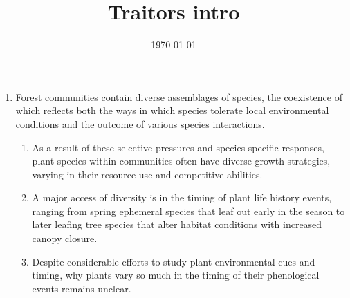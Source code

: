 \documentclass{article}
\begin{document}
\title{Traitors intro}
\date{\today}

\maketitle 

\begin{enumerate}

\item Forest communities contain diverse assemblages of species, the coexistence of which reflects both the ways in which species tolerate local environmental conditions and the outcome of various species interactions. 
\begin{enumerate}
\item As a result of these selective pressures and species specific responses, plant species within communities often have diverse growth strategies, varying in their resource use and competitive abilities. 
\item  A major access of diversity is in the timing of plant life history events, ranging from spring ephemeral species that leaf out early in the season to later leafing tree species that alter habitat conditions with increased canopy closure.
\item Despite considerable efforts to study plant environmental cues and timing, why plants vary so much in the timing of their phenological events remains unclear.
\end{enumerate}


\end{enumerate}
\end{document}
